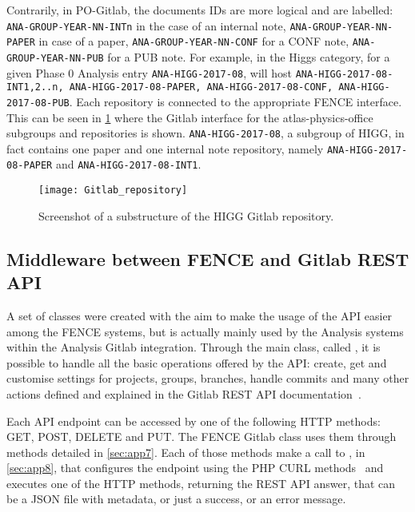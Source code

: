Contrarily, in PO-Gitlab, the documents IDs are more logical and are labelled: \texttt{ANA-GROUP-YEAR-NN-INTn} in the case of an internal note,
\texttt{ANA-GROUP-YEAR-NN-PAPER} in case of a paper,
\texttt{ANA-GROUP-YEAR-NN-CONF} for a CONF note,
\texttt{ANA-GROUP-YEAR-NN-PUB} for a PUB note.
For example, in the Higgs category, for a given Phase 0 Analysis entry \texttt{ANA-HIGG-2017-08},
\pogitlab will host \texttt{ANA-HIGG-2017-08-INT1,2..n, ANA-HIGG-2017-08-PAPER, ANA-HIGG-2017-08-CONF, ANA-HIGG-2017-08-PUB}.
Each repository is connected to the appropriate FENCE interface.
This can be seen in \cref{fig:Gitlab_repository} where the Gitlab interface for the atlas-physics-office subgroups and repositories is shown.
\texttt{ANA-HIGG-2017-08}, a subgroup of HIGG, in fact contains one paper and one internal note repository, namely \texttt{ANA-HIGG-2017-08-PAPER} and \texttt{ANA-HIGG-2017-08-INT1}.

\begin{figure}[htb]
  \centering
  \texttt{[image: Gitlab\_repository]}
  \caption{Screenshot of a substructure of the HIGG Gitlab repository.}%
  \label{fig:Gitlab_repository}
\end{figure}

\subsection{Middleware between FENCE and Gitlab REST API}%
\label{sec:Middleware_between_FENCE_and_Gitlab_REST_API}

A set of classes were created with the aim to make the usage of the \gitlab API easier among the FENCE systems, but is actually mainly used by the Analysis systems within the Analysis Gitlab integration.
Through the main class, called , it is possible to handle all the basic operations offered by the API\@: create, get and customise settings for projects, groups, branches, handle commits and many other actions defined and explained in the Gitlab REST API documentation~\cite{rest_api}.

Each API endpoint can be accessed by one of the following HTTP methods: GET, POST, DELETE and PUT\@.
The FENCE Gitlab class uses them through methods detailed in \cref{sec:app7}.
Each of those methods make a call to , in \cref{sec:app8}, that configures the endpoint using the PHP CURL methods~\cite{php_curl} and executes one of the HTTP methods, returning the REST API answer, that can be a JSON file with metadata, or just a success, or an error message.

